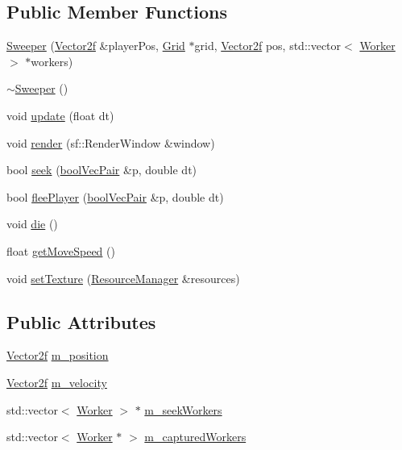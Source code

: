 \subsection*{Public Member Functions}
\begin{DoxyCompactItemize}
\item 
\mbox{\hyperlink{class_sweeper_a0abeb1949c394caaf87dc35f8577b381}{Sweeper}} (\mbox{\hyperlink{class_vector2f}{Vector2f}} \&player\+Pos, \mbox{\hyperlink{class_grid}{Grid}} $\ast$grid, \mbox{\hyperlink{class_vector2f}{Vector2f}} pos, std\+::vector$<$ \mbox{\hyperlink{class_worker}{Worker}} $>$ $\ast$workers)
\item 
\mbox{\hyperlink{class_sweeper_a3099037dc68c87b680a8b235fb61848c}{$\sim$\+Sweeper}} ()
\item 
void \mbox{\hyperlink{class_sweeper_aa186e2bb4c00d8f00c6a947cfd7b4a08}{update}} (float dt)
\item 
void \mbox{\hyperlink{class_sweeper_a8308b5cec3c19e0292947081100d777b}{render}} (sf\+::\+Render\+Window \&window)
\item 
bool \mbox{\hyperlink{class_sweeper_a385f654eafc2891bcff50e46e586abd8}{seek}} (\mbox{\hyperlink{struct_sweeper_1_1bool_vec_pair}{bool\+Vec\+Pair}} \&p, double dt)
\item 
bool \mbox{\hyperlink{class_sweeper_a449bae50886a8b27fceed990054693e5}{flee\+Player}} (\mbox{\hyperlink{struct_sweeper_1_1bool_vec_pair}{bool\+Vec\+Pair}} \&p, double dt)
\item 
void \mbox{\hyperlink{class_sweeper_a5ef8f36cd096c86448db221b8d26298f}{die}} ()
\item 
float \mbox{\hyperlink{class_sweeper_a2bbd96a95a34c2612b559224bd99a2a0}{get\+Move\+Speed}} ()
\item 
void \mbox{\hyperlink{class_sweeper_ae4cd1dcb134140b6a357c3e61b96d326}{set\+Texture}} (\mbox{\hyperlink{class_resource_manager}{Resource\+Manager}} \&resources)
\end{DoxyCompactItemize}
\subsection*{Public Attributes}
\begin{DoxyCompactItemize}
\item 
\mbox{\hyperlink{class_vector2f}{Vector2f}} \mbox{\hyperlink{class_sweeper_a2de9bfbe25a8e7a4c0520c74a325e037}{m\+\_\+position}}
\item 
\mbox{\hyperlink{class_vector2f}{Vector2f}} \mbox{\hyperlink{class_sweeper_aeda6c4d7941d3715a6c5ff55c8688fa5}{m\+\_\+velocity}}
\item 
std\+::vector$<$ \mbox{\hyperlink{class_worker}{Worker}} $>$ $\ast$ \mbox{\hyperlink{class_sweeper_a30fbaca5409925343d7e5e1feaf13c68}{m\+\_\+seek\+Workers}}
\item 
std\+::vector$<$ \mbox{\hyperlink{class_worker}{Worker}} $\ast$ $>$ \mbox{\hyperlink{class_sweeper_ad78cc8acbe42fb51ac5e9a52a3820c68}{m\+\_\+captured\+Workers}}
\end{DoxyCompactItemize}
